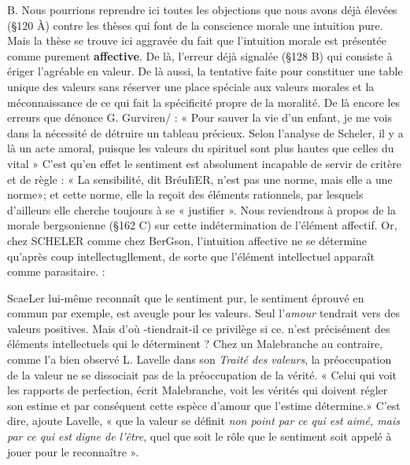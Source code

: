 B. Nous pourrions reprendre ici toutes les objections que nous
avons déjà élevées (\S 120 À) contre les thèses qui font de la conscience
morale une intuition pure. Mais la thèse se trouve ici aggravée du fait
que l'intuition morale est présentée comme purement {\bf affective}. De
là, l'erreur déjà signalée (\S 128 B) qui consiste à ériger l’agréable en
valeur. De là aussi, la tentative faite pour constituer une table unique
des valeurs sans réserver une place spéciale aux valeurs morales et la
méconnaissance de ce qui fait la spécificité propre de la moralité.
De là encore les erreurs que dénonce G. Gurviren/ : « Pour sauver
la vie d’un enfant, je me vois dans la nécessité de détruire un tableau
précieux. Selon l’analyse de Scheler, il y a là un acte amoral, puisque
les valeurs du spirituel sont plus hautes que celles du vital » C'est
qu’en effet le sentiment est absolument incapable de servir de critère
et de règle : « La sensibilité, dit BréuIïER, n’est pas une norme, mais
elle a une norme»; et cette norme, elle la reçoit des éléments rationnels,
par lesquels d’ailleurs elle cherche toujours à se « justifier ».
Nous reviendrons à propos de la morale bergsonienne (\S 162 C)
sur cette indétermination de l’élément affectif. Or, chez SCHELER
comme chez BerGson, l’intuition affective ne se détermine qu'après
coup intellectugllement, de sorte que l’élément intellectuel apparaît
comme parasitaire. :

ScaeLer lui-même reconnaît que le sentiment pur, le sentiment
éprouvé en commun par exemple, est aveugle pour les valeurs. Seul
l'{\it amour} tendrait vers des valeurs positives. Mais d’où -tiendrait-il
ce privilège si ce. n’est précisément des éléments intellectuels qui le
déterminent ? Chez un Malebranche au contraire, comme l’a bien
observé L. Lavelle dans son {\it Traité des valeurs}, la préoccupation
de la valeur ne se dissociait pas de la préoccupation de la vérité.
« Celui qui voit les rapports de perfection, écrit Malebranche, voit
les vérités qui doivent régler son estime et par conséquent cette espèce
d'amour que l'estime détermine.» C’est dire, ajoute Lavelle, « que la
valeur se définit {\it non point par ce qui est aimé, mais par ce qui est
digne de l'être}, quel que soit le rôle que le sentiment soit appelé à
jouer pour le reconnaître ».


